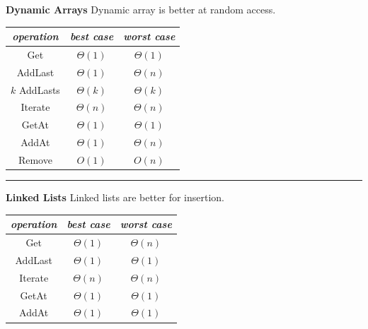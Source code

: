 \documentclass[9pt]{amsart}
\begin{document}
\begin{multicols*}{3}
  \textbf{Dynamic Arrays}
  \newline
  Dynamic array is better at random access.
  \footnotesize
  \begin{center}
  \begin{tabular}{c | c | c}
     \emph{operation} & \emph{best case} & \emph{worst case} \\
     \hline
     Get & $\Theta(1)$ & $\Theta(1)$ \\
     \hline
     AddLast & $\Theta(1)$ & $\Theta(n)$ \\
     \hline
     $k$ AddLasts & $\Theta(k)$ & $\Theta(k)$ \\
     \hline
     Iterate & $\Theta(n)$ & $\Theta(n)$ \\
     \hline
     GetAt & $\Theta(1)$ & $\Theta(1)$ \\
     \hline
     AddAt & $\Theta(1)$ & $\Theta(n)$ \\
     \hline
     Remove & $O(1)$ & $O(n)$
  \end{tabular}
  \end{center}
  \normalsize

  \vskip 7pt
  \hrule
  \vskip 7pt

  \textbf{Linked Lists}
  \newline
  Linked lists are better for insertion.
  \footnotesize
  \begin{center}
  \begin{tabular}{c | c | c}
     \emph{operation} & \emph{best case} & \emph{worst case} \\
     \hline
     Get & $\Theta(1)$ & $\Theta(n)$ \\
     \hline
     AddLast & $\Theta(1)$ & $\Theta(1)$ \\
     \hline
     Iterate & $\Theta(n)$ & $\Theta(n)$ \\
     \hline
     GetAt & $\Theta(1)$ & $\Theta(1)$ \\
     \hline
     AddAt & $\Theta(1)$ & $\Theta(1)$ \\
  \end{tabular}
  \end{center}
  \normalsize


\end{multicols*}
\end{document}
